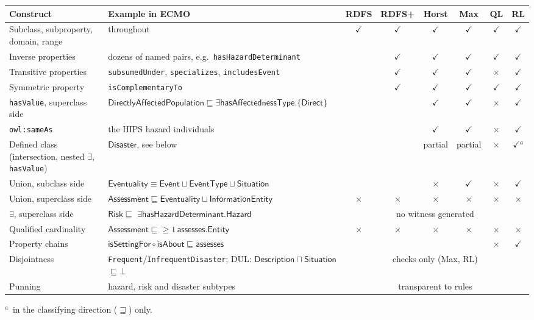 \documentclass[11pt,a4paper]{article}
\newcommand{\cn}[1]{\mathsf{#1}}      %
\newcommand{\rn}[1]{\mathsf{#1}}      %
\newcommand{\ind}[1]{\mathsf{#1}}     %
\newcommand{\sub}{\sqsubseteq}
\newcommand{\eqv}{\equiv}
\begin{document}
\begin{table}[h]
\centering
\footnotesize
\newcommand{\tyes}{$\checkmark$}
\newcommand{\tno}{$\times$}
\setlength{\tabcolsep}{4pt}
\begin{tabular}{@{}p{3.2cm}p{4.9cm}cccccc@{}}
\toprule
\textbf{Construct} & \textbf{Example in ECMO} & \textbf{RDFS} & \textbf{RDFS+} &
  \textbf{Horst} & \textbf{Max} & \textbf{QL} & \textbf{RL}\\
\midrule
Subclass, subproperty, domain, range & throughout
  & \tyes & \tyes & \tyes & \tyes & \tyes & \tyes\\
Inverse properties & dozens of named pairs, e.g.\ \texttt{hasHazardDeterminant}
  & & \tyes & \tyes & \tyes & \tyes & \tyes\\
Transitive properties & \texttt{subsumedUnder}, \texttt{specializes},
  \texttt{includesEvent}
  & & \tyes & \tyes & \tyes & \tno & \tyes\\
Symmetric property & \texttt{isComplementaryTo}
  & & \tyes & \tyes & \tyes & \tyes & \tyes\\
\texttt{hasValue}, superclass side
  & $\cn{DirectlyAffectedPopulation} \sub \exists\rn{hasAffectednessType}.\{\ind{Direct}\}$
  & & & \tyes & \tyes & \tno & \tyes\\
\texttt{owl:sameAs} & the HIPS hazard individuals
  & & & \tyes & \tyes & \tno & \tyes\\
Defined class (intersection, nested $\exists$, \texttt{hasValue})
  & $\cn{Disaster}$, see below
  & & & partial & partial & \tno & \tyes$^{a}$\\
Union, subclass side & $\cn{Eventuality} \eqv \cn{Event} \sqcup \cn{EventType} \sqcup \cn{Situation}$
  & & & \tno & \tyes & \tno & \tyes\\
Union, superclass side & $\cn{Assessment} \sub \cn{Eventuality} \sqcup \cn{InformationEntity}$
  & \tno & \tno & \tno & \tno & \tno & \tno\\
$\exists$, superclass side & $\cn{Risk} \sub$ $\exists\rn{hasHazardDeterminant}.\cn{Hazard}$
  & \multicolumn{6}{c}{no witness generated}\\
Qualified cardinality & $\cn{Assessment} \sub {\geq}1\,\rn{assesses}.\cn{Entity}$
  & \tno & \tno & \tno & \tno & \tno & \tno\\
Property chains & $\rn{isSettingFor} \circ \rn{isAbout} \sub \rn{assesses}$
  & & & & & \tno & \tyes\\
Disjointness & \texttt{Frequent}/\texttt{InfrequentDisaster};
  DUL: $\cn{Description} \sqcap \cn{Situation}$ $\sqsubseteq \bot$
  & \multicolumn{6}{c}{checks only (Max, RL)}\\
Punning & hazard, risk and disaster subtypes
  & \multicolumn{6}{c}{transparent to rules}\\
\bottomrule
\end{tabular}

\smallskip
\raggedright
$^{a}$~in the classifying direction ($\sqsupseteq$) only.
\end{table}
\end{document}
